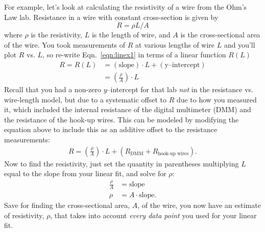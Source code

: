 \documentclass[10pt,letterpaper,twoside]{article}
\begin{document}
For example, let's look at calculating the resistivity of a wire from the Ohm's Law lab.
Resistance in a wire with constant cross-section is given by
\begin{equation}
  R = \rho L / A \label{eqn:linex1}
\end{equation}
where $\rho$ is the resistivity, $L$ is the length of wire, and $A$ is the cross-sectional area of the wire.
You took measurements of $R$ at various lengths of wire $L$ and you'll plot $R$ vs. $L$, so re-write Eqn.~\ref{eqn:linex1} in terms of a linear function $R(L)$
\begin{align}
  R = R(L) &= (\mathrm{slope})\cdot L + (\text{y--intercept}) \\
  &= \left( \frac{\rho}{A} \right)\cdot L
\end{align}
Recall that you had a non-zero $y$--intercept for that lab \textit{not} in the resistance vs. wire-length model, but due to a systematic offset to $R$ due to how you measured it, which included the internal resistance of the digital multimeter (DMM) and the resistance of the hook-up wires.
This can be modeled by modifying the equation above to include this as an additive offset to the resistance measurements:
\begin{align}
  R = \left( \frac{\rho}{A} \right)\cdot L + \left( R_{\text{DMM}} + R_{\text{hook-up wires}} \right).
\end{align}
Now to find the resistivity, just set the quantity in parentheses multiplying $L$ equal to the slope from your linear fit, and solve for $\rho$:
\begin{align}
  \frac{\rho}{A} &= \mathrm{slope}  \\
  \rho &= A\cdot \mathrm{slope}.
\end{align}
Save for finding the cross-sectional area, $A$, of the wire, you now have an estimate of resistivity, $\rho$, that takes into account \textit{every data point} you used for your linear fit.
\end{document}
